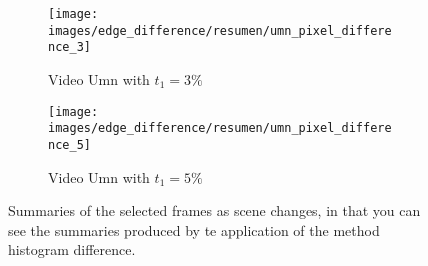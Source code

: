 \documentclass[journal]{IEEEtran}
\begin{document}
\begin{figure}
	\centering
	\begin{subfigure}{0.23\textwidth}
		\centering
		\texttt{[image: images/edge\_difference/resumen/umn\_pixel\_difference\_3]} 
		\caption{Video Umn with $t_1 = 3\%$}
		\label{fig:edge_difference:resumen:umn_3} 
	\end{subfigure}
	\centering
	\begin{subfigure}{0.23\textwidth}
		\centering
		\texttt{[image: images/edge\_difference/resumen/umn\_pixel\_difference\_5]} 
		\caption{Video Umn with $t_1 = 5\%$}
		\label{fig:edge_difference:resumen:umn_5} 
	\end{subfigure}
	
	\caption{Summaries of the selected frames as scene changes, in that you can see the summaries produced by te application of the method histogram difference.}
	\label{fig:edge_difference:resumen}
\end{figure}
\end{document}
